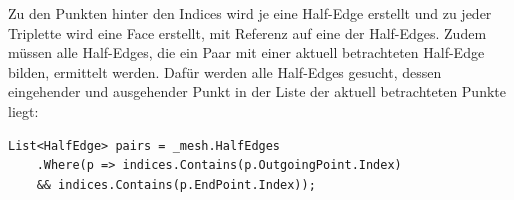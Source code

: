 Zu den Punkten hinter den Indices wird je eine Half-Edge erstellt und zu jeder Triplette wird eine Face erstellt, mit Referenz auf eine der Half-Edges. Zudem m\"ussen alle Half-Edges, die ein Paar mit einer aktuell betrachteten Half-Edge bilden, ermittelt werden. Daf\"ur werden alle Half-Edges gesucht, dessen eingehender und ausgehender Punkt in der Liste der aktuell betrachteten Punkte liegt: 
\begin{lstlisting}
List<HalfEdge> pairs = _mesh.HalfEdges
	.Where(p => indices.Contains(p.OutgoingPoint.Index)
	&& indices.Contains(p.EndPoint.Index));
\end{lstlisting}